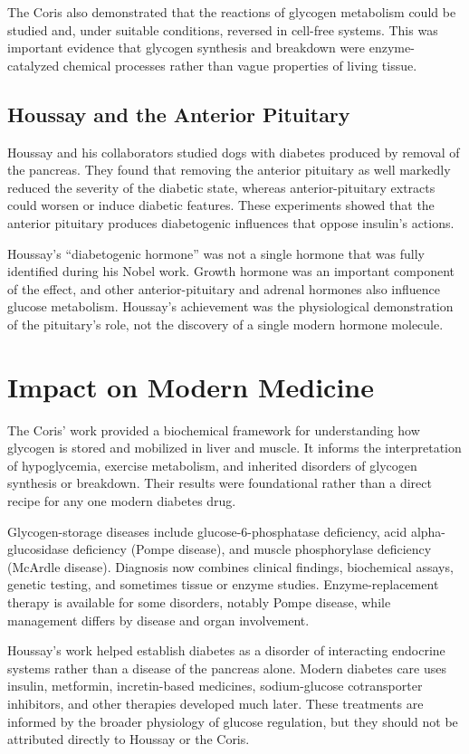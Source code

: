 The Coris also demonstrated that the reactions of glycogen metabolism could be studied and, under suitable conditions, reversed in cell-free systems. This was important evidence that glycogen synthesis and breakdown were enzyme-catalyzed chemical processes rather than vague properties of living tissue.

\subsection{Houssay and the Anterior Pituitary}

Houssay and his collaborators studied dogs with diabetes produced by removal of the pancreas. They found that removing the anterior pituitary as well markedly reduced the severity of the diabetic state, whereas anterior-pituitary extracts could worsen or induce diabetic features. These experiments showed that the anterior pituitary produces diabetogenic influences that oppose insulin's actions.

Houssay's ``diabetogenic hormone'' was not a single hormone that was fully identified during his Nobel work. Growth hormone was an important component of the effect, and other anterior-pituitary and adrenal hormones also influence glucose metabolism. Houssay's achievement was the physiological demonstration of the pituitary's role, not the discovery of a single modern hormone molecule.

\section{Impact on Modern Medicine}

The Coris' work provided a biochemical framework for understanding how glycogen is stored and mobilized in liver and muscle. It informs the interpretation of hypoglycemia, exercise metabolism, and inherited disorders of glycogen synthesis or breakdown. Their results were foundational rather than a direct recipe for any one modern diabetes drug.

Glycogen-storage diseases include glucose-6-phosphatase deficiency, acid alpha-glucosidase deficiency (Pompe disease), and muscle phosphorylase deficiency (McArdle disease). Diagnosis now combines clinical findings, biochemical assays, genetic testing, and sometimes tissue or enzyme studies. Enzyme-replacement therapy is available for some disorders, notably Pompe disease, while management differs by disease and organ involvement.

Houssay's work helped establish diabetes as a disorder of interacting endocrine systems rather than a disease of the pancreas alone. Modern diabetes care uses insulin, metformin, incretin-based medicines, sodium-glucose cotransporter inhibitors, and other therapies developed much later. These treatments are informed by the broader physiology of glucose regulation, but they should not be attributed directly to Houssay or the Coris.

